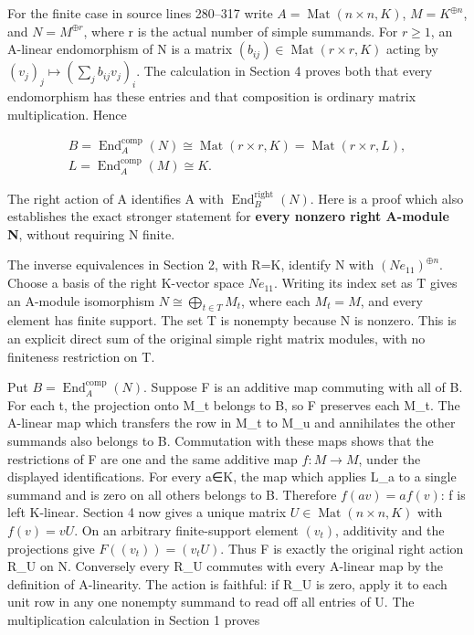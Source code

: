 \documentclass[11pt]{article}
\begin{document}
For the finite case in source lines 280--317 write \(A=\operatorname{Mat}(n\times n,K)\), \(M=K^{\oplus n}\), and \(N=M^{\oplus r}\), where r is the actual number of simple summands. For \(r\geq 1\), an A-linear endomorphism of N is a matrix \((b_{ij})\in \operatorname{Mat}(r\times r,K)\) acting by \((v_{j})_{j}\mapsto (\sum _{j} b_{ij} v_{j})_{i}\). The calculation in Section 4 proves both that every endomorphism has these entries and that composition is ordinary matrix multiplication. Hence

\[\begin{gathered}
B=\operatorname{End}_{A}^{\mathrm{comp}}(N) \cong \operatorname{Mat}(r\times r,K)=\operatorname{Mat}(r\times r,L),\\L=\operatorname{End}_{A}^{\mathrm{comp}}(M)\cong K.
\end{gathered}\]

The right action of A identifies A with \(\operatorname{End}_{B}^{\mathrm{right}}(N)\). Here is a proof which also establishes the exact stronger statement for \textbf{every nonzero right A-module N}, without requiring N finite.

The inverse equivalences in Section 2, with R=K, identify N with \((N e_{11})^{\oplus n}\). Choose a basis of the right K-vector space \(N e_{11}\). Writing its index set as T gives an A-module isomorphism \(N\cong \bigoplus _{t\in T} M_{t}\), where each \(M_{t}=M\), and every element has finite support. The set T is nonempty because N is nonzero. This is an explicit direct sum of the original simple right matrix modules, with no finiteness restriction on T.

Put \(B=\operatorname{End}_{A}^{\mathrm{comp}}(N)\). Suppose F is an additive map commuting with all of B. For each t, the projection onto M\_t belongs to B, so F preserves each M\_t. The A-linear map which transfers the row in M\_t to M\_u and annihilates the other summands also belongs to B. Commutation with these maps shows that the restrictions of F are one and the same additive map \(f:M\to M\), under the displayed identifications. For every a∈K, the map which applies L\_a to a single summand and is zero on all others belongs to B. Therefore \(f(av)=a f(v)\): f is left K-linear. Section 4 now gives a unique matrix \(U\in \operatorname{Mat}(n\times n,K)\) with \(f(v)=vU\). On an arbitrary finite-support element \((v_{t})\), additivity and the projections give \(F((v_{t}))=(v_{t} U)\). Thus F is exactly the original right action R\_U on N. Conversely every R\_U commutes with every A-linear map by the definition of A-linearity. The action is faithful: if R\_U is zero, apply it to each unit row in any one nonempty summand to read off all entries of U. The multiplication calculation in Section 1 proves
\end{document}
